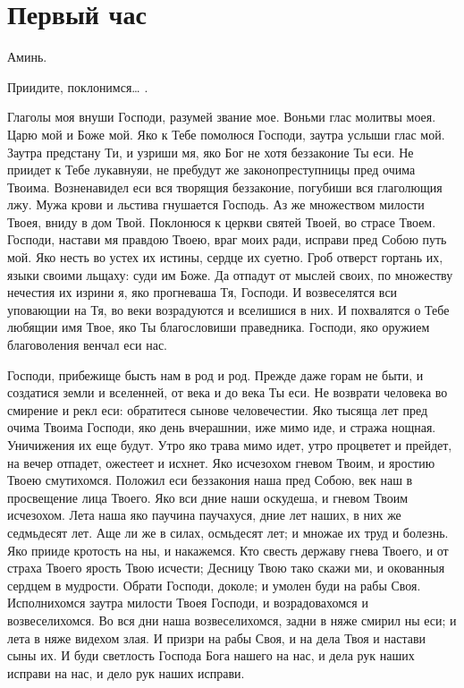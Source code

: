 \section{Первый час}\begin{mymulticols}





 Аминь.

Приидите, поклонимся… .




Глаголы моя внуши Господи, разумей звание мое. Воньми глас молитвы моея. Царю мой и Боже мой. Яко к Тебе помолюся Господи, заутра услыши глас мой. Заутра предстану Ти, и узриши мя, яко Бог не хотя беззаконие Ты еси. Не приидет к Тебе лукавнуяи, не пребудут же законопреступницы пред очима Твоима. Возненавидел еси вся творящия беззаконие, погубиши вся глаголющия лжу. Мужа крови и льстива гнушается Господь. Аз же множеством милости Твоея, вниду в дом Твой. Поклонюся к церкви святей Твоей, во страсе Твоем. Господи, настави мя правдою Твоею, враг моих ради, исправи пред Собою путь мой. Яко несть во устех их истины, сердце их суетно. Гроб отверст гортань их, языки своими льщаху: суди им Боже. Да отпадут от мыслей своих, по множеству нечестия их изрини я, яко прогневаша Тя, Господи. И возвеселятся вси уповающии на Тя, во веки возрадуются и вселишися в них. И похвалятся о Тебе любящии имя Твое, яко Ты благословиши праведника. Господи, яко оружием благоволения венчал еси нас.




Господи, прибежище бысть нам в род и род. Прежде даже горам не быти, и создатися земли и вселенней, от века и до века Ты еси. Не возврати человека во смирение и рекл еси: обратитеся сынове человечестии. Яко тысяща лет пред очима Твоима Господи, яко день вчерашнии, иже мимо иде, и стража нощная. Уничижения их еще будут. Утро яко трава мимо идет, утро процветет и прейдет, на вечер отпадет, ожестеет и исхнет. Яко исчезохом гневом Твоим, и яростию Твоею смутихомся. Положил еси беззакония наша пред Собою, век наш в просвещение лица Твоего. Яко вси дние наши оскудеша, и гневом Твоим исчезохом. Лета наша яко паучина паучахуся, дние лет наших, в них же седмьдесят лет. Аще ли же в силах, осмьдесят лет; и множае их труд и болезнь. Яко прииде кротость на ны, и накажемся. Кто свесть державу гнева Твоего, и от страха Твоего ярость Твою исчести; Десницу Твою тако скажи ми, и окованныя сердцем в мудрости. Обрати Господи, доколе; и умолен буди на рабы Своя. Исполнихомся заутра милости Твоея Господи, и возрадовахомся и возвеселихомся. Во вся дни наша возвеселихомся, задни в няже смирил ны еси; и лета в няже видехом злая. И призри на рабы Своя, и на дела Твоя и настави сыны их. И буди светлость Господа Бога нашего на нас, и дела рук наших исправи на нас, и дело рук наших исправи.



\end{mymulticols}
